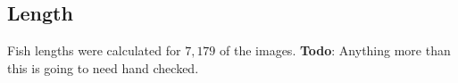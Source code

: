 \documentclass[conference]{IEEEtran}
\begin{document}
\subsection{Length}
Fish lengths were calculated for \(7,179\) of the images. \textbf{Todo}: Anything more than this is going to need hand checked.

\end{document}
